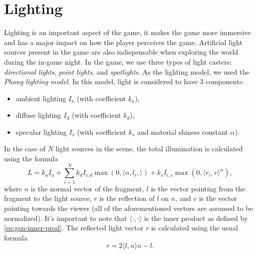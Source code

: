 \section{Lighting}
Lighting is an important aspect of the game, it makes the game more immersive and has a major impact on how the player perceives the game.
Artificial light sources present in the game are also indispensable when exploring the world during the in-game night.
In the game, we use three types of light casters: \textit{directional lights}, \textit{point lights}, and \textit{spotlights}.
As the lighting model, we used the \textit{Phong lighting model}.
In this model, light is considered to have 3 components:
\begin{itemize}
    \item ambient lighting $I_a$ (with coefficient $k_a$),
    \item diffuse lighting $I_d$ (with coefficient $k_d$),
    \item specular lighting $I_s$ (with coefficient $k_s$ and material shiness constant $\alpha$).
\end{itemize}
In the case of $N$ light sources in the scene, the total illumination is calculated using the formula
\begin{equation}
    L = k_a I_a + \sum_{i = 1}^N {k_d I_{i, d} \max(0, \langle n, l_i, \rangle) + k_s I_{i, s} \max(0, \langle r_i, v \rangle^\alpha )},
\end{equation}
where $n$ is the normal vector of the fragment, $l$ is the vector pointing from the fragment to the light source, $r$ is the reflection of $l$ on $n$, and $v$ is the vector pointing towards the viewer (all of the aforementioned vectors are assumed to be normalized).
It's important to note that $\langle \cdot, \cdot\rangle$ is the inner product as defined by \autoref{eq:gen-inner-prod}.
The reflected light vector $r$ is calculated using the usual formula
\begin{equation*}
    r = 2 \langle l, n \rangle n - l.
\end{equation*}



